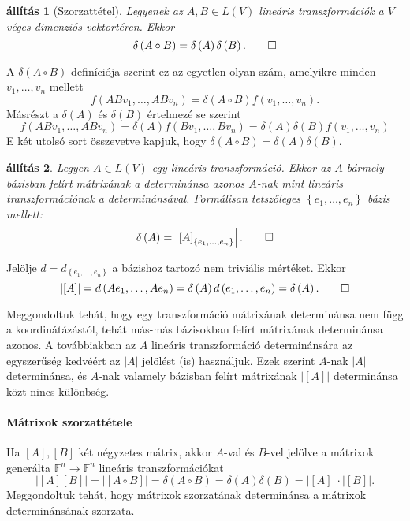 \documentclass[9pt, a4paper, showtrims]{memoir}
\makeatletter
\renewenvironment{proof}[1][\proofname]
    {\par\pushQED{\qed}%
    \normalfont \topsep6\p@\@plus6\p@\relax
    \trivlist
    \item[\hskip\labelsep
        \itshape
    #1\@addpunct{:}]\ignorespaces}
    {\popQED\endtrivlist\@endpefalse}
\theoremstyle{plain}
\newtheorem{proposition}{állítás}[chapter]
\theoremstyle{remark}
\theoremstyle{definition}
\makeatother
\begin{document}
\begin{proposition}[Szorzattétel]
	Legyenek az $A,B\in L\left( V \right)$ lineáris transzformációk a $V$ véges dimenziós vektortéren.
	Ekkor
	\[
		\delta\left( A\circ B\right)
		=
		\delta\left( A\right) \delta\left( B\right).
		\qedhere
	\]
\end{proposition}
\begin{proof}
	A $\delta \left( A\circ B\right) $ definíciója szerint ez az egyetlen olyan
	szám, amelyikre minden $v_{1},\ldots ,v_{n}$ mellett
	\[
		f\left( ABv_{1},\ldots ,ABv_{n}\right) =\delta \left( A\circ B\right)
		f\left( v_{1},\ldots ,v_{n}\right) .
	\]
	Másrészt a $\delta \left( A\right) $ és $\delta \left( B\right) $ értelmezé%
	se szerint
	\[
		f\left( ABv_{1},\ldots ,ABv_{n}\right) =\delta \left( A\right) f\left(
		Bv_{1},\ldots ,Bv_{n}\right) =\delta \left( A\right) \delta \left( B\right)
		f\left( v_{1},\ldots ,v_{n}\right)
	\]
	E két utolsó sort összevetve kapjuk, hogy $\delta \left( A\circ B\right)
		=\delta \left( A\right) \delta \left( B\right) .$
\end{proof}

\begin{proposition}
	Legyen $A\in L\left( V\right)$ egy lineáris transzformáció.
	Ekkor az $A$ bármely bázisban felírt mátrixának a determinánsa azonos
	$A$-nak mint lineáris transzformációnak a determinánsával.
	Formálisan tetszőleges $\left\{ e_1,\ldots,e_n \right\}$ bázis mellett:
	\[
		\delta \left( A\right)
		=
		\left|
		\left[
			A
			\right]_{\left\{ e_{1},\ldots ,e_{n}\right\} }
		\right|.\qedhere
	\]
\end{proposition}
\begin{proof}
	Jelölje $d=d_{\left\{e_1,\ldots,e_n\right\}}$ a bázishoz tartozó nem triviális mértéket.
	Ekkor
	\[
		\left| \left[ A\right] \right| =d\left( Ae_{1},\ldots ,Ae_{n}\right) =\delta
		\left( A\right) d\left( e_{1},\ldots ,e_{n}\right) =\delta \left( A\right) . \qedhere
	\]
\end{proof}

Meggondoltuk tehát, hogy egy transzformáció mátrixának determinánsa nem függ a koordinátázástól,
tehát más-más bázisokban felírt mátrixának determinánsa azonos.
A továbbiakban az $A$ lineáris transzformáció determinánsára az egyszerűség kedvéért az $|A|$ jelölést (is) használjuk.
Ezek szerint $A$-nak $|A|$ determinánsa,
és $A$-nak valamely bázisban felírt mátrixának $|[A]|$ determinánsa közt nincs különbség.

\paragraph{Mátrixok szorzattétele}
Ha $[A],[B]$ két négyzetes mátrix,
akkor $A$-val és $B$-vel jelölve a
mátrixok generálta $\mathbb{F}^n\to\mathbb{F}^n$ lineáris transzformációkat
\[
	|[A][B]|=|[A\circ B]|=\delta\left( A\circ B \right)=\delta\left( A \right)\delta\left( B \right)=
	|[A]|\cdot|[B]|.
\]
Meggondoltuk tehát, hogy mátrixok szorzatának determinánsa a mátrixok determinánsának szorzata.
\end{document}
